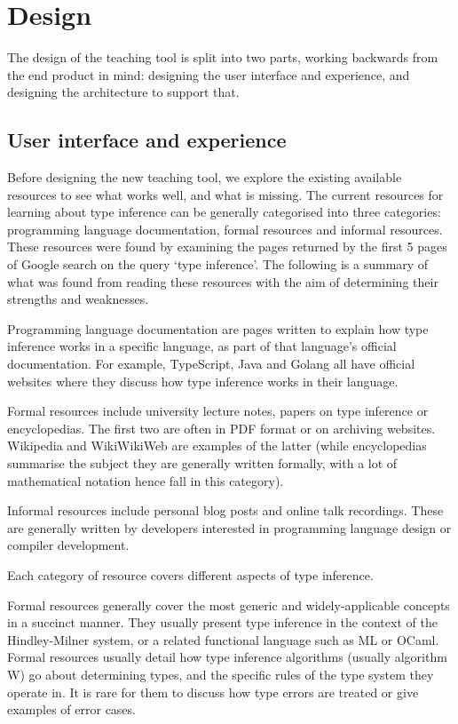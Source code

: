 \documentclass[a4paper,fleqn,oneside,12pt]{report}
\begin{document}
\chapter{Design}\label{id:h.7ggvdxb04tzm}

The design of the teaching tool is split into two parts, working backwards from the end product in mind: designing the user interface and experience, and designing the architecture to support that.

\section{User interface and experience}\label{id:h.dr046u473e01}

Before designing the new teaching tool, we explore the existing available resources to see what works well, and what is missing. The current resources for learning about type inference can be generally categorised into three categories: programming language documentation, formal resources and informal resources. These resources were found by examining the pages returned by the first 5 pages of Google search on the query ‘type inference’. The following is a summary of what was found from reading these resources with the aim of determining their strengths and weaknesses.

Programming language documentation are pages written to explain how type inference works in a specific language, as part of that language’s official documentation. For example, TypeScript, Java and Golang all have official websites where they discuss how type inference works in their language.

Formal resources include university lecture notes, papers on type inference or encyclopedias. The first two are often in PDF format or on archiving websites. Wikipedia and WikiWikiWeb are examples of the latter (while encyclopedias summarise the subject they are generally written formally, with a lot of mathematical notation hence fall in this category).

Informal resources include personal blog posts and online talk recordings. These are generally written by developers interested in programming language design or compiler development.

Each category of resource covers different aspects of type inference.

Formal resources generally cover the most generic and widely-applicable concepts in a succinct manner. They usually present type inference in the context of the Hindley-Milner system, or a related functional language such as ML or OCaml. Formal resources usually detail how type inference algorithms (usually algorithm W) go about determining types, and the specific rules of the type system they operate in. It is rare for them to discuss how type errors are treated or give examples of error cases.
\end{document}
